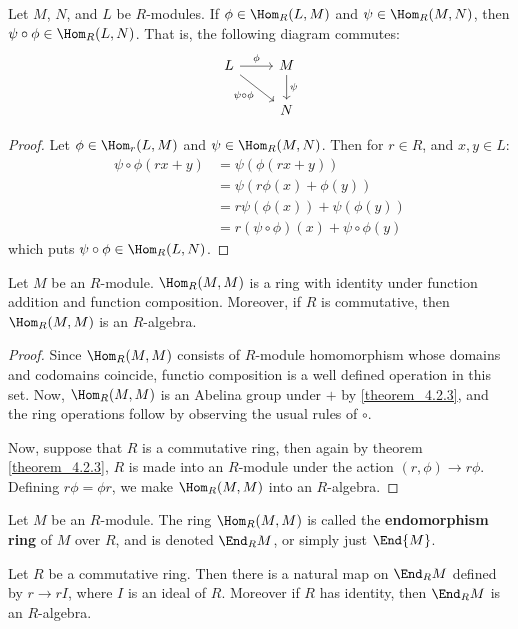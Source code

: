 \begin{theorem}\label{theorem_4.2.4}
  Let $M$, $N$, and $L$ be  $R$-modules. If  $\phi \in \Hom_R{(L,M)}$
  and $\psi \in \Hom_R{(M,N)}$, then $\psi \circ \phi \in
  \Hom_R{(L,N)}$. That is, the following diagram commutes:
  \[\begin{tikzcd}
    L & M \\
      & N
      \arrow["\phi", from=1-1, to=1-2]
      \arrow["{\psi \circ \phi}"', from=1-1, to=2-2]
      \arrow["\psi", from=1-2, to=2-2]
  \end{tikzcd}\]
\end{theorem}
\begin{proof}
  Let $\phi \in \Hom_r{(L,M)}$ and $\psi \in \Hom_R{(M,N)}$. Then for
  $r \in R$, and $x,y \in L$:
  \begin{align*}
    \psi \circ \phi(rx+y) &=  \psi(\phi(rx+y))  \\
      &=  \psi(r\phi(x)+\phi(y))  \\
      &=  r\psi(\phi(x))+\psi(\phi(y))  \\
      &= r(\psi \circ \phi)(x)+\psi \circ \phi(y)
  \end{align*}
  which puts $\psi \circ \phi \in \Hom_R{(L,N)}$.
\end{proof}

\begin{theorem}\label{theorem_4.2.5}
  Let $M$ be an  $R$-module.  $\Hom_R{(M,M)}$ is a ring with identity
  under function addition and function composition. Moreover, if $R$
  is commutative, then $\Hom_R{(M,M)}$ is an $R$-algebra.
\end{theorem}
\begin{proof}
  Since $\Hom_R{(M,M)}$ consists of $R$-module homomorphism whose
  domains and codomains coincide, functio composition is a well
  defined operation in this set. Now, $\Hom_R{(M,M)}$ is an Abelina
  group under $+$ by \ref{theorem_4.2.3}, and the ring operations
  follow by observing the usual rules of $\circ$.

  Now, suppose that $R$ is a commutative ring, then again by theorem
  \ref{theorem_4.2.3}, $R$ is made into an $R$-module under the action
  $(r,\phi) \xrightarrow{} r\phi$. Defining $r\phi=\phi r$, we make
  $\Hom_R{(M,M)}$ into an $R$-algebra.
\end{proof}

\begin{definition}
  Let $M$ be an  $R$-module. The ring  $\Hom_R{(M,M)}$ is called the
  \textbf{endomorphism ring} of $M$ over $R$, and is denoted
  $\End_R{M}$, or simply just $\End{M}$.
\end{definition}

\begin{lemma}\label{lemma_4.2.6}
  Let $R$ be a commutative ring. Then there is a natural map on
  $\End_R{M}$ defined by $r \xrightarrow{} rI$, where $I$ is an ideal
  of $R$. Moreover if $R$ has identity, then  $\End_R{M}$ is an
  $R$-algebra.
\end{lemma}
